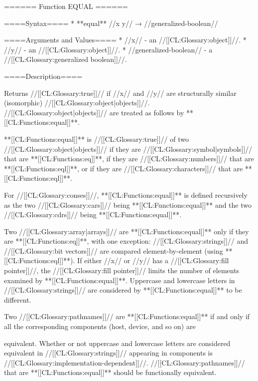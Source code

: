 ====== Function EQUAL ======

====Syntax====
  * **equal** //x y// → //generalized-boolean//

====Arguments and Values====
  * //x// - an //[[CL:Glossary:object]]//.
  * //y// - an //[[CL:Glossary:object]]//.
  * //generalized-boolean// - a //[[CL:Glossary:generalized boolean]]//.

====Description====

Returns //[[CL:Glossary:true]]// if //x// and //y// are structurally similar (isomorphic) //[[CL:Glossary:object|objects]]//. //[[CL:Glossary:object|objects]]// are treated as follows by **[[CL:Functions:equal]]**.

\beginlist {}

**[[CL:Functions:equal]]** is //[[CL:Glossary:true]]// of two //[[CL:Glossary:object|objects]]// if they are //[[CL:Glossary:symbol|symbols]]// that are **[[CL:Functions:eq]]**, if they are //[[CL:Glossary:numbers]]// that are **[[CL:Functions:eql]]**, or if they are //[[CL:Glossary:characters]]// that are **[[CL:Functions:eql]]**.


For //[[CL:Glossary:conses]]//, **[[CL:Functions:equal]]** is defined recursively as the two //[[CL:Glossary:cars]]// being **[[CL:Functions:equal]]** and the two //[[CL:Glossary:cdrs]]// being **[[CL:Functions:equal]]**.


Two //[[CL:Glossary:array|arrays]]// are **[[CL:Functions:equal]]** only if they are **[[CL:Functions:eq]]**, with one exception: //[[CL:Glossary:strings]]// and //[[CL:Glossary:bit vectors]]// are compared element-by-element (using **[[CL:Functions:eql]]**). If either //x// or //y// has a //[[CL:Glossary:fill pointer]]//, the //[[CL:Glossary:fill pointer]]// limits the number of elements examined by **[[CL:Functions:equal]]**. Uppercase and lowercase letters in //[[CL:Glossary:strings]]// are considered by **[[CL:Functions:equal]]** to be different.


Two //[[CL:Glossary:pathnames]]// are **[[CL:Functions:equal]]** if and only if all the corresponding components (host, device, and so on) are

equivalent. Whether or not uppercase and lowercase letters are considered equivalent in //[[CL:Glossary:strings]]// appearing in components is //[[CL:Glossary:implementation-dependent]]//. //[[CL:Glossary:pathnames]]// that are **[[CL:Functions:equal]]** should be functionally equivalent.

